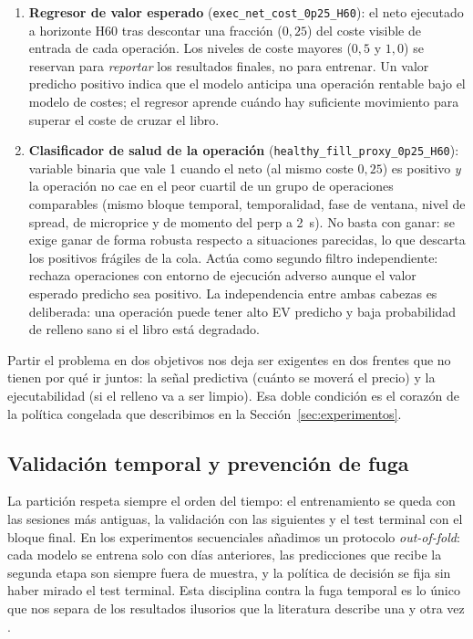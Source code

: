 \documentclass[11pt,a4paper]{article}
\begin{document}
\begin{enumerate}[noitemsep]
  \item \textbf{Regresor de valor esperado} (\texttt{exec\_net\_cost\_0p25\_H60}):
  el neto ejecutado a horizonte H60 tras descontar una fracción ($0{,}25$) del coste
  visible de entrada de cada operación. Los niveles de coste mayores ($0{,}5$ y
  $1{,}0$) se reservan para \emph{reportar} los resultados finales, no para entrenar.
  Un valor predicho positivo indica que el modelo anticipa una operación rentable
  bajo el modelo de costes; el regresor aprende cuándo hay suficiente movimiento para
  superar el coste de cruzar el libro.

  \item \textbf{Clasificador de salud de la operación}
  (\texttt{healthy\_fill\_proxy\_0p25\_H60}): variable binaria que vale 1 cuando el
  neto (al mismo coste $0{,}25$) es positivo \emph{y} la operación no cae en el peor
  cuartil de un grupo de operaciones comparables (mismo bloque temporal, temporalidad,
  fase de ventana, nivel de spread, de microprice y de momento del perp a 2~s). No
  basta con ganar: se exige ganar de forma robusta respecto a situaciones parecidas,
  lo que descarta los positivos frágiles de la cola. Actúa como segundo filtro
  independiente: rechaza operaciones con entorno de ejecución adverso aunque el valor
  esperado predicho sea positivo. La independencia entre ambas cabezas es deliberada:
  una operación puede tener alto EV predicho y baja probabilidad de relleno sano si el
  libro está degradado.
\end{enumerate}

Partir el problema en dos objetivos nos deja ser exigentes en dos frentes que no
tienen por qué ir juntos: la señal predictiva (cuánto se moverá el precio) y la
ejecutabilidad (si el relleno va a ser limpio). Esa doble condición es el corazón de
la política congelada que describimos en la Sección~\ref{sec:experimentos}.

\subsection{Validación temporal y prevención de fuga}

La partición respeta siempre el orden del tiempo: el entrenamiento se queda con las
sesiones más antiguas, la validación con las siguientes y el test terminal con el
bloque final. En los experimentos secuenciales añadimos un protocolo
\emph{out-of-fold}: cada modelo se entrena solo con días anteriores, las
predicciones que recibe la segunda etapa son siempre fuera de muestra, y la política
de decisión se fija sin haber mirado el test terminal. Esta disciplina contra la
fuga temporal es lo único que nos separa de los resultados ilusorios que la
literatura describe una y otra vez \cite{lopezdeprado2018, gu2020empirical}.
\end{document}
